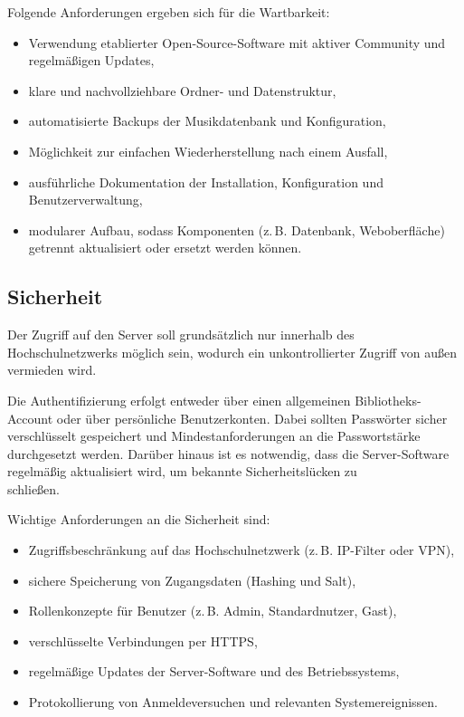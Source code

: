 \documentclass[12pt,a4paper]{report}
\begin{document}
  Folgende Anforderungen ergeben sich für die Wartbarkeit:
  \begin{itemize}
    \item Verwendung etablierter Open-Source-Software mit aktiver Community und regelmäßigen Updates,
    \item klare und nachvollziehbare Ordner- und Datenstruktur,
    \item automatisierte Backups der Musikdatenbank und Konfiguration,
    \item Möglichkeit zur einfachen Wiederherstellung nach einem Ausfall,
    \item ausführliche Dokumentation der Installation, Konfiguration und Benutzerverwaltung,
    \item modularer Aufbau, sodass Komponenten (z.\,B. Datenbank, Weboberfläche) getrennt aktualisiert oder ersetzt werden können.
  \end{itemize}

  \subsection{Sicherheit}  
  Der Zugriff auf den Server soll grundsätzlich nur innerhalb des Hochschulnetzwerks möglich sein, 
  wodurch ein unkontrollierter Zugriff von außen vermieden wird.  

  Die Authentifizierung erfolgt entweder über einen allgemeinen Bibliotheks-Account oder über persönliche Benutzerkonten. 
  Dabei sollten Passwörter sicher verschlüsselt gespeichert und Mindestanforderungen an die Passwortstärke durchgesetzt werden.  
  Darüber hinaus ist es notwendig, dass die Server-Software regelmäßig aktualisiert wird, um bekannte Sicherheitslücken zu\\schließen.  

  Wichtige Anforderungen an die Sicherheit sind:
  \begin{itemize}
    \item Zugriffsbeschränkung auf das Hochschulnetzwerk (z.\,B. IP-Filter oder VPN),
    \item sichere Speicherung von Zugangsdaten (Hashing und Salt),
    \item Rollenkonzepte für Benutzer (z.\,B. Admin, Standardnutzer, Gast),
    \item verschlüsselte Verbindungen per \ac{HTTPS},
    \item regelmäßige Updates der Server-Software und des Betriebssystems,
    \item Protokollierung von Anmeldeversuchen und relevanten Systemereignissen.
  \end{itemize}
\end{document}
